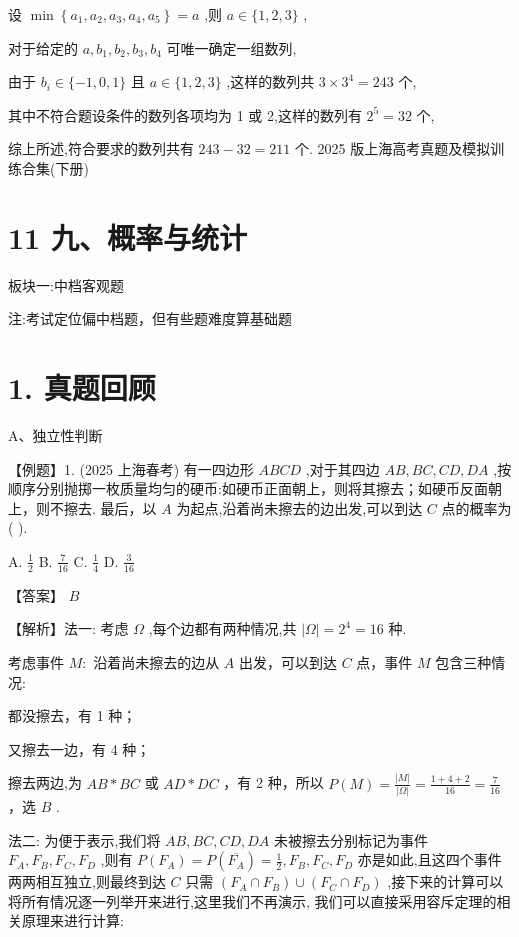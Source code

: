 \documentclass[10pt]{article}
\newcommand*\circled[1]{\tikz[baseline=(char.base)]{\node[shape=circle,draw,inner sep=1.5pt] (char) {\small #1};}}
\begin{document}
设 \(\min \left\{  {{a}_{1},{a}_{2},{a}_{3},{a}_{4},{a}_{5}}\right\}   = a\) ,则 \(a \in  \{ 1,2,3\}\) ,

对于给定的 \(a,{b}_{1},{b}_{2},{b}_{3},{b}_{4}\) 可唯一确定一组数列,

由于 \({b}_{i} \in  \{  - 1,0,1\}\) 且 \(a \in  \{ 1,2,3\}\) ,这样的数列共 \(3 \times  {3}^{4} = {243}\) 个,

其中不符合题设条件的数列各项均为 1 或 2,这样的数列有 \({2}^{5} = {32}\) 个,

综上所述,符合要求的数列共有 \({243} - {32} = {211}\) 个. 2025 版上海高考真题及模拟训练合集(下册)

\section*{11 九、概率与统计}

板块一:中档客观题

注:考试定位偏中档题，但有些题难度算基础题

\section*{1. 真题回顾}

A、独立性判断

【例题】1. (2025 上海春考) 有一四边形 \({ABCD}\) ,对于其四边 \({AB},{BC},{CD},{DA}\) ,按顺序分别抛掷一枚质量均匀的硬币:如硬币正面朝上，则将其擦去；如硬币反面朝上，则不擦去. 最后，以 \(A\) 为起点,沿着尚未擦去的边出发,可以到达 \(C\) 点的概率为( ).

A. \(\frac{1}{2}\) B. \(\frac{7}{16}\) C. \(\frac{1}{4}\) D. \(\frac{3}{16}\)

【答案】 \(B\)

【解析】法一: 考虑 \(\Omega\) ,每个边都有两种情况,共 \(\left| \Omega \right|  = {2}^{4} = {16}\) 种.

考虑事件 \(M :\) 沿着尚未擦去的边从 \(A\) 出发，可以到达 \(C\) 点，事件 \(M\) 包含三种情况:

 \circled{1} 都没擦去，有 1 种；

 \circled{2} 又擦去一边，有 4 种；

 \circled{3}  擦去两边,为 \({AB} * {BC}\) 或 \({AD} * {DC}\) ，有 2 种，所以 \(P\left( M\right)  = \frac{\left| M\right| }{\left| \Omega \right| } = \frac{1 + 4 + 2}{16} = \frac{7}{16}\) ，选 \(B\) .

法二: 为便于表示,我们将 \({AB},{BC},{CD},{DA}\) 未被擦去分别标记为事件 \({F}_{A},{F}_{B},{F}_{C},{F}_{D}\) ,则有 \(P\left( {F}_{A}\right)  = P\left( \overline{{F}_{A}}\right)  = \frac{1}{2},{F}_{B},{F}_{C},{F}_{D}\) 亦是如此,且这四个事件两两相互独立,则最终到达 \(C\) 只需 \(\left( {{F}_{A} \cap  {F}_{B}}\right)  \cup  \left( {{F}_{C} \cap  {F}_{D}}\right)\) ,接下来的计算可以将所有情况逐一列举开来进行,这里我们不再演示, 我们可以直接采用容斥定理的相关原理来进行计算:
\end{document}
